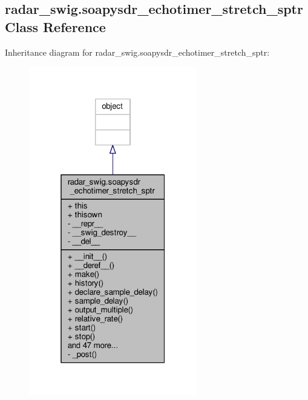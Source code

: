 \subsection{radar\+\_\+swig.\+soapysdr\+\_\+echotimer\+\_\+stretch\+\_\+sptr Class Reference}
\label{classradar__swig_1_1soapysdr__echotimer__stretch__sptr}


Inheritance diagram for radar\+\_\+swig.\+soapysdr\+\_\+echotimer\+\_\+stretch\+\_\+sptr\+:
\nopagebreak
\begin{figure}[H]
\begin{center}
\leavevmode
\includegraphics[width=208pt]{da/da7/classradar__swig_1_1soapysdr__echotimer__stretch__sptr__inherit__graph}
\end{center}
\end{figure}


